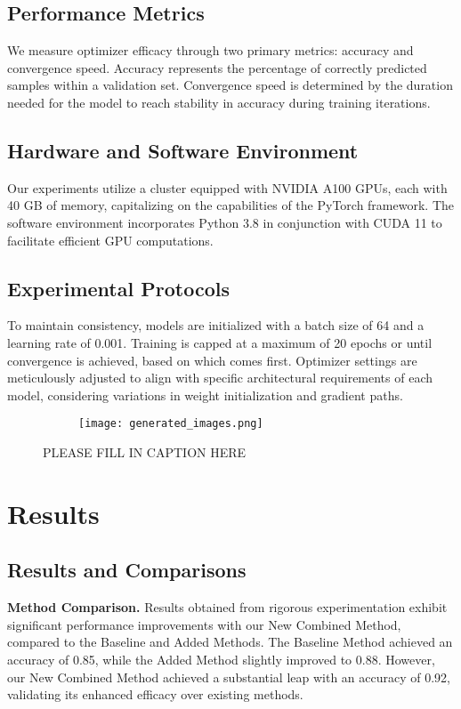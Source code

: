 \documentclass{article} %
\begin{document}
\subsection{Performance Metrics}
We measure optimizer efficacy through two primary metrics: accuracy and convergence speed. Accuracy represents the percentage of correctly predicted samples within a validation set. Convergence speed is determined by the duration needed for the model to reach stability in accuracy during training iterations.

\subsection{Hardware and Software Environment}
Our experiments utilize a cluster equipped with NVIDIA A100 GPUs, each with 40 GB of memory, capitalizing on the capabilities of the PyTorch framework. The software environment incorporates Python 3.8 in conjunction with CUDA 11 to facilitate efficient GPU computations.

\subsection{Experimental Protocols}
To maintain consistency, models are initialized with a batch size of 64 and a learning rate of 0.001. Training is capped at a maximum of 20 epochs or until convergence is achieved, based on which comes first. Optimizer settings are meticulously adjusted to align with specific architectural requirements of each model, considering variations in weight initialization and gradient paths.

\begin{figure}[t]
    \centering
    \begin{subfigure}{0.9\textwidth}
        \texttt{[image: generated\_images.png]}
        \label{fig:diffusion-samples}
    \end{subfigure}
    \caption{PLEASE FILL IN CAPTION HERE}
    \label{fig:first_figure}
\end{figure}

\section{Results}
\label{sec:results}
\subsection{Results and Comparisons}
\textbf{Method Comparison.} Results obtained from rigorous experimentation exhibit significant performance improvements with our New Combined Method, compared to the Baseline and Added Methods. The Baseline Method achieved an accuracy of 0.85, while the Added Method slightly improved to 0.88. However, our New Combined Method achieved a substantial leap with an accuracy of 0.92, validating its enhanced efficacy over existing methods.
\end{document}
